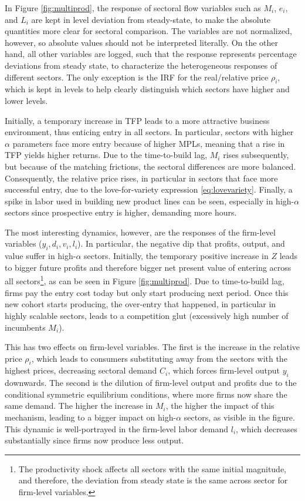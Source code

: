 \documentclass[a4paper,12pt]{article} %
\numberwithin{equation}{section} %
\numberwithin{figure}{section}
\numberwithin{table}{section}
\begin{document}
In Figure \ref{fig:multiprod}, the response of sectoral flow variables such as $M_i$, $e_i$, and $L_i$ are kept in level
deviation from steady-state, to make the absolute quantities more clear for sectoral comparison. The variables are not normalized, however,
so absolute values should not be interpreted literally. On the other hand, all other
variables are logged, such that the response represents percentage deviations from steady state, to characterize the heterogeneous
responses of different sectors. The only exception is the IRF for the real/relative price $\rho_i$, which is 
kept in levels to help clearly distinguish which sectors have higher and lower levels.

Initially, a temporary increase in TFP leads to a more attractive business environment, thus enticing
entry in all sectors. In particular, sectors with higher $\alpha$ parameters face more entry because of higher MPLs,
meaning that a rise in TFP yields higher returns. Due to the time-to-build lag, $M_i$ rises subsequently, but because
of the matching frictions, the sectoral differences are more balanced. Consequently, the relative price rises, in particular in
sectors that face more successful entry, due to the love-for-variety expression \eqref{eq:lovevariety}. Finally, a spike in
labor used in building new product lines can be seen, especially in high-$\alpha$ sectors since prospective entry is higher, demanding more
hours.

The most interesting dynamics, however, are the responses of the firm-level variables ($y_i,d_i,v_i,l_i$). In particular, the
negative dip that profits, output, and value suffer in high-$\alpha$ sectors. Initially, the temporary positive 
increase in $Z$ leads to bigger future profits and therefore bigger net present value of entering across all sectors\footnote{The productivity shock affects
all sectors with the same initial magnitude, and therefore, the deviation from steady state is the same across sector for firm-level variables.}, as can be
seen in Figure \ref{fig:multiprod}. Due to time-to-build lag, firms pay the entry cost today but only start producing
next period. Once this new cohort starts producing, the over-entry that happened, in particular in highly scalable sectors, leads
to a competition glut (excessively high number of incumbents $M_i$). 

This has two effects on firm-level variables. The first is the
increase in the relative price $\rho_i$, which leads to consumers substituting away from the sectors with the highest prices, decreasing
sectoral demand $C_i$, which forces firm-level output $y_i$ downwards. The second is the dilution of
firm-level output and profits due to the conditional symmetric equilibrium conditions, where more firms now share the same demand.
The higher the increase in $M_i$, the higher the impact of this mechanism, leading to a bigger impact on high-$\alpha$ sectors, as visible
in the figure. This dynamic is well-portrayed in the firm-level labor demand $l_i$, which decreases substantially since firms now produce 
less output.
\end{document}
